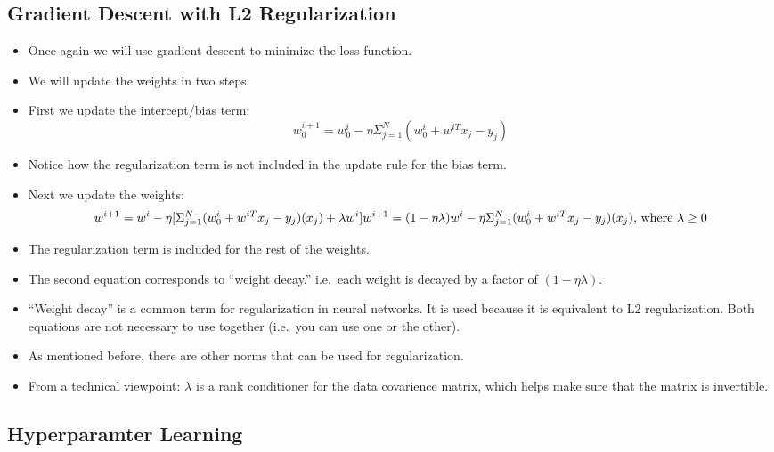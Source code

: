 \documentclass[12pt]{article}
\begin{document}
        \subsection{Gradient Descent with L2 Regularization}
            \begin{itemize}
                \item Once again we will use gradient descent to minimize the loss function.
                \item We will update the weights in two steps.
                \item First we update the intercept/bias term:
                \begin{equation}
                    w_0^{i+1} = w_0^i - \eta \Sigma_{j=1}^N (w_0^i + w^{iT}x_j-y_j)
                \end{equation}
                \item Notice how the regularization term is not included in the update rule for the bias term.
                \item Next we update the weights:
                \begin{equation}
                    w^{i+1} = w^i - \eta [ \Sigma_{j=1}^N (w_0^i + w^{iT}x_j-y_j)(x_j) + \lambda w^i ] \\
                    w^{i+1} = (1 - \eta \lambda) w^i - \eta \Sigma_{j=1}^N (w_0^i + w^{iT}x_j-y_j)(x_j) \text{, where } \lambda \geq 0
                \end{equation}
                \item The regularization term is included for the rest of the weights.
                \item The second equation corresponds to ``weight decay.'' i.e.\ each weight is decayed by a factor of $(1 - \eta \lambda)$.
                \item ``Weight decay'' is a common term for regularization in neural networks. It is used because it is equivalent to L2 regularization. Both equations are not necessary to use together (i.e.\ you can use one or the other).
                \item As mentioned before, there are other norms that can be used for regularization.
                \item From a technical viewpoint: $\lambda$ is a rank conditioner for the data covarience matrix, which helps make sure that the matrix is invertible.
            \end{itemize}
    \subsection{Hyperparamter Learning}
\end{document}

